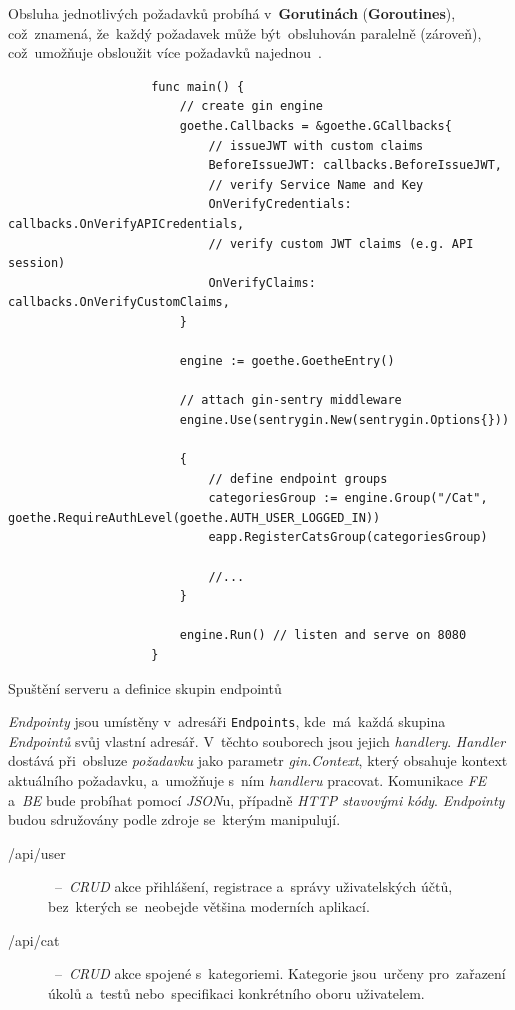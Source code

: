 \documentclass[11pt,a4paper]{report}
\let\oldacrshort\acrshort
\renewcommand{\acrshort}[1]{\emph{\normalsize\color[rgb]{0,0,0}\noindent\oldacrshort{#1}}}
\begin{document}
            Obsluha jednotlivých požadavků probíhá v~\textbf{Gorutinách} (\textbf{Goroutines}), což~znamená, že~každý požadavek může být~obsluhován paralelně (zároveň), což~umožňuje obsloužit více požadavků najednou~\cite{effective_go}.

            \begin{code}
                \begin{verbatim}
                    func main() {
                    	// create gin engine
                    	goethe.Callbacks = &goethe.GCallbacks{
                    		// issueJWT with custom claims
                    		BeforeIssueJWT: callbacks.BeforeIssueJWT,
                    		// verify Service Name and Key
                    		OnVerifyCredentials: callbacks.OnVerifyAPICredentials,
                    		// verify custom JWT claims (e.g. API session)
                    		OnVerifyClaims: callbacks.OnVerifyCustomClaims,
                    	}
                    
                    	engine := goethe.GoetheEntry()
                    
                    	// attach gin-sentry middleware
                    	engine.Use(sentrygin.New(sentrygin.Options{}))
                    
                    	{
                    		// define endpoint groups
                    		categoriesGroup := engine.Group("/Cat", goethe.RequireAuthLevel(goethe.AUTH_USER_LOGGED_IN))
                    		eapp.RegisterCatsGroup(categoriesGroup)
                      
                            //...
                    	}
                    
                    	engine.Run() // listen and serve on 8080
                    }
                \end{verbatim}
                \caption{Spuštění serveru a definice skupin endpointů}
                \label{go:enginerun}
            \end{code}

            \emph{Endpointy} jsou umístěny v~adresáři \texttt{Endpoints}, kde~má~každá skupina \emph{Endpointů} svůj vlastní adresář. V~těchto souborech jsou jejich \emph{handlery}. \emph{Handler} dostává při~obsluze \emph{požadavku} jako parametr \emph{gin.Context}, který obsahuje kontext aktuálního požadavku, a~umožňuje s~ním \emph{handleru} pracovat. Komunikace \acrshort{FE} a~\acrshort{BE} bude probíhat pomocí \emph{JSON}u, případně \emph{HTTP stavovými kódy}. \emph{Endpointy} budou sdružovány podle zdroje se~kterým manipulují.
            \begin{description}
                \item[/api/user]~--~\emph{CRUD} akce přihlášení, registrace a~správy uživatelských účtů, bez~kterých se~neobejde většina moderních aplikací.
                \item[/api/cat]~--~\emph{CRUD} akce spojené s~kategoriemi. Kategorie jsou~určeny pro~zařazení úkolů a~testů nebo~specifikaci konkrétního oboru uživatelem.
            \end{description}
\end{document}
